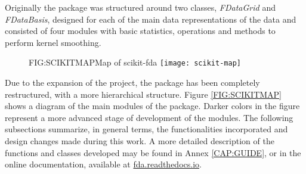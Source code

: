 
Originally the package was structured around two classes, \textit{FDataGrid} and
\textit{FDataBasis}, designed for each of the main data representations of the data and
consisted of four modules with basic statistics, operations and methods to
perform kernel smoothing.

\begin{figure}[Map of scikit-fda]{FIG:SCIKITMAP}{Map of scikit-fda \cite{ramos-carrenoScikitfdaPythonPackage2019}}
	\texttt{[image: scikit-map]}
\end{figure}


Due to the expansion of the project, the package has been completely
restructured, with a more hierarchical structure. Figure \ref{FIG:SCIKITMAP}
shows a diagram of the main modules of the package. Darker colors in the figure represent a more advanced stage of development of the modules.
The following
subsections summarize, in general terms, the functionalities incorporated and
design changes made during this work. A more detailed description of the functions and classes developed may be found
in Annex \ref{CAP:GUIDE}, or in the online documentation, available at \href{https://fda.readthedocs.io/}{fda.readthedocs.io}.
